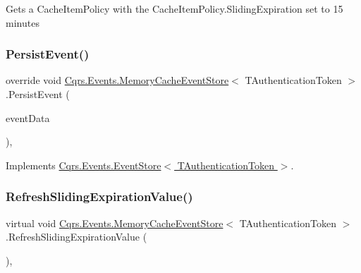 Get\textquotesingle{}s a Cache\+Item\+Policy with the Cache\+Item\+Policy.\+Sliding\+Expiration set to 15 minutes 

\mbox{\label{classCqrs_1_1Events_1_1MemoryCacheEventStore_a9b1a1aaab34770bd68ebcedca0fc40b0_a9b1a1aaab34770bd68ebcedca0fc40b0}} 
\subsubsection{\texorpdfstring{Persist\+Event()}{PersistEvent()}}
{\footnotesize\ttfamily override void \hyperlink{classCqrs_1_1Events_1_1MemoryCacheEventStore}{Cqrs.\+Events.\+Memory\+Cache\+Event\+Store}$<$ T\+Authentication\+Token $>$.Persist\+Event (\begin{DoxyParamCaption}\item[{\hyperlink{classCqrs_1_1Events_1_1EventData}{Event\+Data}}]{event\+Data }\end{DoxyParamCaption})\hspace{0.3cm}{\ttfamily [protected]}, {\ttfamily [virtual]}}



Implements \hyperlink{classCqrs_1_1Events_1_1EventStore_aedb71ca0ddf21220e323bc60ad7508cd_aedb71ca0ddf21220e323bc60ad7508cd}{Cqrs.\+Events.\+Event\+Store$<$ T\+Authentication\+Token $>$}.

\mbox{\label{classCqrs_1_1Events_1_1MemoryCacheEventStore_a4cac39acb87d9e25c4c090a384515d11_a4cac39acb87d9e25c4c090a384515d11}} 
\subsubsection{\texorpdfstring{Refresh\+Sliding\+Expiration\+Value()}{RefreshSlidingExpirationValue()}}
{\footnotesize\ttfamily virtual void \hyperlink{classCqrs_1_1Events_1_1MemoryCacheEventStore}{Cqrs.\+Events.\+Memory\+Cache\+Event\+Store}$<$ T\+Authentication\+Token $>$.Refresh\+Sliding\+Expiration\+Value (\begin{DoxyParamCaption}{ }\end{DoxyParamCaption})\hspace{0.3cm}{\ttfamily [protected]}, {\ttfamily [virtual]}}

